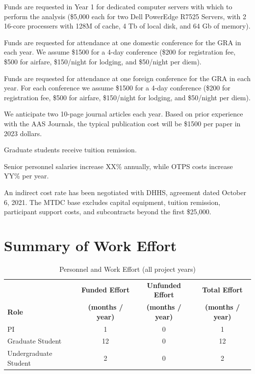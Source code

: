 \documentclass[12pt, preprint]{hacked-aastex}
\begin{document}
 Funds are requested in Year 1 for 
dedicated computer  servers with which to perform the analysis (\$5,000 each
for two Dell PowerEdge R7525 Servers, with 2 16-core processers with 128M 
of cache, 4 Tb of local disk,  and 64 Gb of memory).

 Funds are requested for attendance at
one domestic conference for the GRA in each year. We assume \$1500 for
a 4-day conference (\$200 for registration fee, \$500 for airfare,
\$150/night for lodging, and \$50/night per diem).

 Funds are requested for attendance at
one foreign conference for the GRA in each year. For each conference
we assume \$1500 for a 4-day conference (\$200 for registration fee,
\$500 for airfare, \$150/night for lodging, and \$50/night per diem).

 We anticipate two 10-page journal
articles each year. Based on prior experience with the AAS Journals,
the typical publication cost will be \$1500 per paper in 2023 dollars.

Graduate students receive tuition remission. %

 Senior personnel salaries increase XX\%
annually, while OTPS costs increase YY\% per year. %

 An indirect cost rate has been
negotiated with DHHS, agreement dated October 6, 2021.
The MTDC base excludes capital equipment, tuition
remission, participant support costs, and subcontracts beyond the
first \$25,000. 

\clearpage
\section{Summary of Work Effort}\label{sec:effort}


\begin{table}[h!]
\centering
\caption{Personnel and Work Effort (all project years)\label{table:effort}} 
\begin{tabular}{lccc}
\\
\hline
& {\bf Funded Effort} & {\bf Unfunded Effort} & {\bf Total Effort} \\
{\bf Role} & {\bf (months / year)} & {\bf (months / year)} 
& {\bf (months / year)} \\
\hline
\hline
PI & 1 & 0 & 1 \\
Graduate Student & 12 & 0 & 12 \\
Undergraduate Student & 2 & 0 & 2 \\
\hline
\end{tabular}
\end{table}
\end{document}
